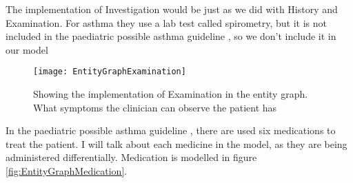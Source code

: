 The implementation of Investigation would be just as we did with History and Examination. For asthma they use a lab test called spirometry, but it is not included in the paediatric possible asthma guideline \cite{RepublicofKeny2016}, so we don't include it in our model

\begin{figure}[h!]
	\caption {Showing the implementation of Examination in the entity graph. What symptoms the clinician can observe the patient has}
	\label{fig:EntityGraphExamination}
	\texttt{[image: EntityGraphExamination]}
\end{figure}

In the paediatric possible asthma guideline \cite{RepublicofKeny2016}, there are used six medications to treat the patient. I will talk about each medicine in the model, as they are being administered differentially. Medication is modelled in figure \ref{fig:EntityGraphMedication}.



